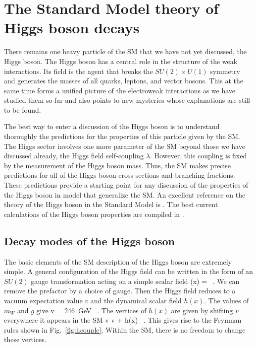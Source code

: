 \documentclass[12pt]{article}
\begin{document}
\section{The Standard Model theory of Higgs boson decays}

There remains one heavy particle of the SM that we have not yet
discussed, the Higgs boson.  The Higgs boson has a central role in the
structure of the weak interactions.   Its field is the agent that
breaks the $SU(2)\times U(1)$ symmetry and generates the masses of all
quarks, leptons, and vector bosons.   This at the same time forms a
unified picture of the electroweak interactions as we have studied
them so far and also points to new mysteries whose explanations are
still to be found.

The best way to enter a discussion of the Higgs boson is to understand
thoroughly the predictions for the properties of this particle given
by the SM.   The Higgs sector involves one more parameter of the SM
beyond those we have discussed already, the Higgs field self-coupling
$\lambda$.  However, this coupling is fixed by the measurement of the
Higgs
boson mass.  Thus, the SM makes precise predictions for all of the
Higgs boson cross sections and branching fractions.   These
predictions provide a starting point for any discussion of the
properties of the Higgs boson in model that generalize the SM. An
excellent reference on the theory of the Higgs boson in the Standard
Model is \cite{HHGuide}.  The best current calculations of the Higgs
boson properties are compiled in \cite{HiggsHandbook}. 



\subsection{Decay modes of the Higgs boson}


The basic elements of the SM description of the Higgs boson are
extremely simple.  A general configuration of the Higgs field can be 
written in the form of an $SU(2)$ gauge transformation acting on a 
simple scalar field
\beq
\varphi(x) =    
\ .
\eeqn
We can remove the prefactor by a choice of gauge.  Then the Higgs
field reduces to a vacuum expectation value $v$ and the dynamical
scalar field $h(x)$.   The values of $m_W$ and $g$ give
\beq
           v = 246~\mbox{GeV} \ . 
\eeqn
The vertices of $h(x)$ are given by shifting $v$ everywhere it appears
in the SM
\beq
    v \to v + h(x) \ . 
This gives rise to the Feynman rules shown in Fig.~\ref{fig:hcouple}.
Within the SM, there is no freedom to change these vertices.
\end{document}
